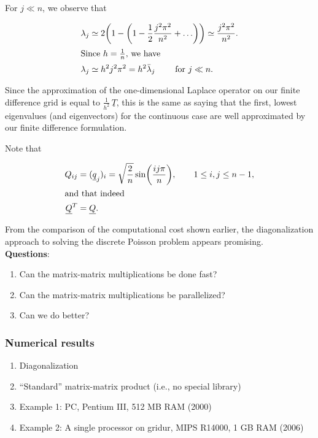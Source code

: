 \documentclass[11pt]{article}
\begin{document}
For ${j \ll n}$, we observe that

\begin{align*}
  \lambda_j &\simeq 2 \biggl( 1 - \biggl( 1 -\frac{1}{2} \frac{j^2 \pi^2}{n^2} + \ldots \biggr) \biggr) \simeq \frac{j^2 \pi^2}{n^2}. \\
  \intertext{Since $h=\frac{1}{n}$, we have}
  \lambda_j &\simeq h^2j^2 \pi^2 = h^2 \bar{\lambda}_j \qquad \text{ for } j \ll n.
\end{align*}

Since the approximation of the one-dimensional Laplace operator on our finite difference grid is 
equal to $\frac{1}{h^2}\,\underline{T}$, this is the same as saying that the first, lowest eigenvalues 
(and eigenvectors) for the continuous case are well approximated by our finite difference formulation.

Note that 

\begin{align*}
 Q_{ij} &= (\underline{q}_j)_i = \sqrt{\frac{2}{n}} \sin \biggl( \frac{ij \pi}{n} \biggr),  \qquad 1 \leq i,j \leq n-1, \\
  \intertext{and that indeed}
  \underline{{Q}}^T &= \underline{{Q}}.
\end{align*}

From the comparison of the computational cost shown earlier, the diagonalization approach to solving the discrete Poisson problem appears promising.\\

{\bf Questions}: 
\begin{enumerate}
\item Can the matrix-matrix multiplications be done fast?
\item Can the matrix-matrix multiplications be parallelized?
\item Can we do better?
\end{enumerate}

\newpage
\subsubsection{Numerical results}

\renewcommand{\theenumi}{$\bullet$}
\renewcommand{\labelenumi}{\theenumi}
\begin{enumerate}
  \item
    Diagonalization

  \item
    ``Standard'' matrix-matrix product (i.e., no special library)

  \item
    Example 1: PC, Pentium III, 512 MB RAM (2000)
    \item 
    Example 2: A single processor on gridur, MIPS R14000, 1 GB RAM (2006)

 \end{enumerate}
   
\end{document}

